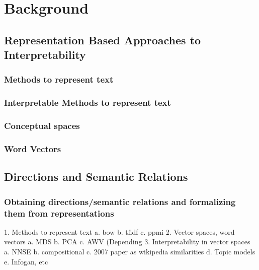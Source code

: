 \chapter{Background}
\section{Representation Based Approaches to Interpretability}
\subsection{Methods to represent text}
\subsection{Interpretable Methods to represent text}
\subsection{Conceptual spaces}
\subsection{Word Vectors}
\section{Directions and Semantic Relations}
\subsection{Obtaining directions/semantic relations and formalizing them from representations}

1. Methods to represent text
a. bow
b. tfidf
c. ppmi
2. Vector spaces, word vectors
a. MDS
b. PCA
c. AWV (Depending
3. Interpretability in vector spaces
a. NNSE
b. compositional
c. 2007 paper as wikipedia similarities
d. Topic models
e. Infogan, etc

